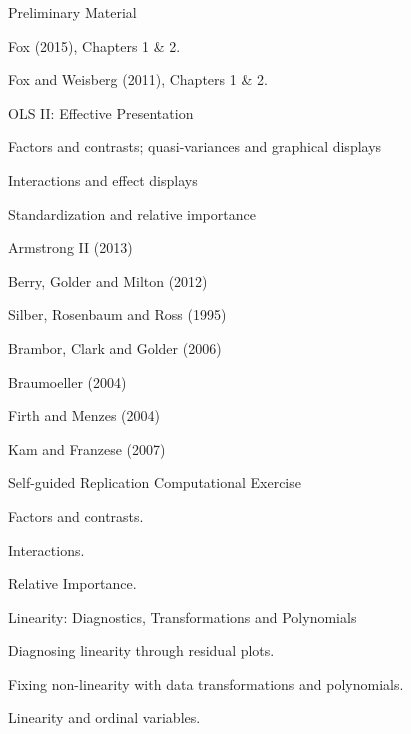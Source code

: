 \documentclass[letterpaper]{article}
\renewenvironment{itemize}{
  \begin{list}{}{
    \setlength{\leftmargin}{1.5em}
  }
}{
  \end{list}
}
\begin{document}
\begin{enumerate}


	\item Preliminary Material

		\begin{itemize}
			\item[$\star$] Fox (2015), Chapters 1 \& 2.
			\item[$\star$] Fox and Weisberg (2011), Chapters 1 \& 2.
		\end{itemize}


	\item OLS II: Effective Presentation

		\begin{itemize}
			\item[$\square$] Factors and contrasts; quasi-variances and graphical displays 
			\item[$\square$] Interactions and effect displays
			\item[$\square$] Standardization and relative importance
		\end{itemize}


		\begin{itemize}
			\item[$\star$] Armstrong II (2013)
			\item[$\star$] Berry, Golder and Milton (2012)
			\item[$\star$] Silber, Rosenbaum and Ross (1995) 
			\item[-] Brambor, Clark and Golder (2006) 
			\item[-] Braumoeller (2004)
			\item[-] Firth and Menzes (2004)
			\item[-] Kam and Franzese (2007)

		\end{itemize}

	
	\item Self-guided Replication Computational Exercise

			\begin{itemize}
				\item[$\square$] Factors and contrasts.
				\item[$\square$] Interactions.
				\item[$\square$] Relative Importance.
			\end{itemize}

	\item Linearity: Diagnostics, Transformations and Polynomials 

			\begin{itemize}
				\item[$\square$] Diagnosing linearity through residual plots.
				\item[$\square$] Fixing non-linearity with data transformations and polynomials.
				\item[$\square$] Linearity and ordinal variables.
			\end{itemize}



\end{enumerate}
\end{document}
